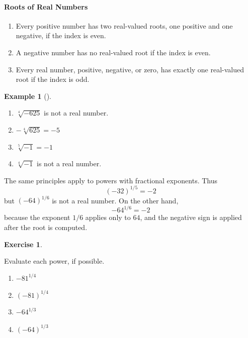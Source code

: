 \documentclass[10pt,]{book}
\theoremstyle{plain}
\theoremstyle{definition}
\theoremstyle{definition}
\theoremstyle{definition}
\newtheorem{example}[theorem]{Example}
\theoremstyle{definition}
\theoremstyle{definition}
\newtheorem{exercise}[theorem]{Exercise}
\numberwithin{equation}{section}
\begin{document}
\paragraph[Roots of Real Numbers]{Roots of Real Numbers}\label{paragraphs-50}
\leavevmode%
\begin{enumerate}
\item\hypertarget{li-510}{}Every positive number has two real-valued roots, one positive and one negative, if the index is even.\item\hypertarget{li-511}{}A negative number has no real-valued root if the index is even.\item\hypertarget{li-512}{}Every real number, positive, negative, or zero, has exactly one real-valued root if the index is odd.\end{enumerate}
\begin{example}[]\label{example-roots-of-negatives}
\leavevmode%
\begin{enumerate}[label=*\alph**]
\item\hypertarget{li-513}{}\(\sqrt[4]{−625}\) is not a real number.\item\hypertarget{li-514}{}\( − \sqrt[4]{625} = −5\)\item\hypertarget{li-515}{}\( \sqrt[5]{−1} = −1\)\item\hypertarget{li-516}{}\( \sqrt[4]{−1}\) is not a real number.\end{enumerate}
\end{example}
\par

    The same principles apply to powers with fractional exponents. Thus
    \begin{equation*}(−32)^{1/5} = −2\end{equation*}
    but \((−64)^{1/6}\) is not a real number. On the other hand,
    \begin{equation*}−64^{1/6} = −2\end{equation*}
    because the exponent \(1/6\) applies only to \(64\), and the negative sign is applied after the root is computed.
%
\begin{exercise}\label{exercise-roots-of-negatives}

    Evaluate each power, if possible.
    \leavevmode%
\begin{enumerate}[label=*\alph**]
\item\hypertarget{li-517}{}\(−81^{1/4}\)\item\hypertarget{li-518}{}\( (−81)^{1/4}\)\item\hypertarget{li-519}{}\( −64^{1/3}\)\item\hypertarget{li-520}{}\( (−64)^{1/3}\)\end{enumerate}
\end{exercise}
\typeout{************************************************}
\typeout{************************************************}
\end{document}
